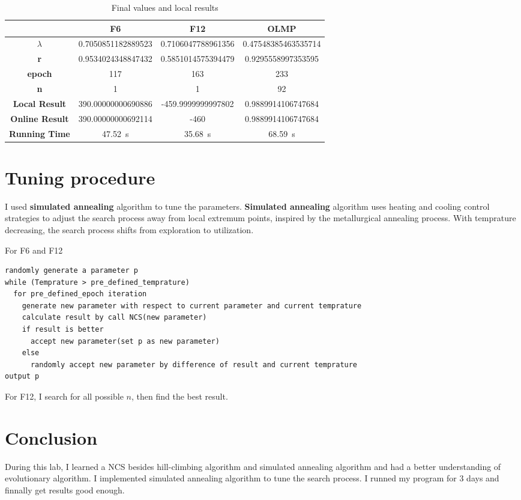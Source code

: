 \documentclass[lang=en,12pt]{elegantpaper}
\newcommand{\mysec}[1] {
  \SI[per-mode=symbol]{#1}{\second}
}
\begin{document}
\begin{table}[htbp]
  \small
  \centering
  \caption{Final values and local results \label{tab:reg}}
    \begin{tabular}{cccc}
    \toprule
                           &       F6           &         F12        &        OLMP         \\
    \midrule
    \textbf{$\lambda$}     & 0.7050851182889523 & 0.7106047788961356 & 0.47548385463535714 \\
    \textbf{r}             & 0.9534024348847432 & 0.5851014575394479 & 0.9295558997353595  \\
    \textbf{epoch}         &        117         &         163        &        233          \\
    \textbf{n}             &         1          &          1         &         92          \\
    \textbf{Local Result}  & 390.00000000690886 & -459.9999999997802 & 0.9889914106747684  \\
    \textbf{Online Result} & 390.00000000692114 &        -460        & 0.9889914106747684  \\
    \textbf{Running Time}  &   \mysec{47.52}    &    \mysec{35.68}   &    \mysec{68.59}    \\
    \bottomrule
    \end{tabular}%
\end{table}%

\section{Tuning procedure}
I used \textbf{simulated annealing} algorithm to tune the parameters.
\textbf{Simulated annealing} algorithm uses heating and cooling control strategies to adjust the search process away from local extremum points, inspired by the metallurgical annealing process.
With temprature decreasing, the search process shifts from exploration to utilization.

For F6 and F12
\begin{lstlisting}
randomly generate a parameter p
while (Temprature > pre_defined_temprature)
  for pre_defined_epoch iteration
    generate new parameter with respect to current parameter and current temprature
    calculate result by call NCS(new parameter)
    if result is better
      accept new parameter(set p as new parameter)
    else
      randomly accept new parameter by difference of result and current temprature
output p
\end{lstlisting}

For F12, I search for all possible $n$, then find the best result.

\section{Conclusion}
During this lab, I learned a NCS besides hill-climbing algorithm and simulated annealing algorithm and had a better understanding of evolutionary algorithm.
I implemented simulated annealing algorithm to tune the search process. I runned my program for 3 days and finnally get results good enough.

\nocite{*}

\end{document}
